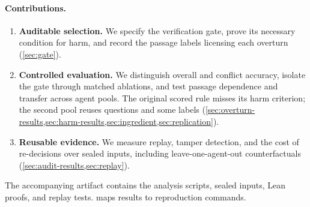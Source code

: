 \paragraph{Contributions.}
\begin{enumerate}
  \item \textbf{Auditable selection.} We specify the verification gate, prove its necessary condition for harm, and record the passage labels licensing each overturn (\cref{sec:gate}).
  \item \textbf{Controlled evaluation.} We distinguish overall and conflict accuracy, isolate the gate through matched ablations, and test passage dependence and transfer across agent pools. The original scored rule misses its harm criterion; the second pool reuses questions and some labels (\cref{sec:overturn-results,sec:harm-results,sec:ingredient,sec:replication}).
  \item \textbf{Reusable evidence.} We measure replay, tamper detection, and the cost of re-decisions over sealed inputs, including leave-one-agent-out counterfactuals (\cref{sec:audit-results,sec:replay}).
\end{enumerate}

The accompanying artifact contains the analysis scripts, sealed inputs, Lean proofs, and replay tests.  maps results to reproduction commands.
